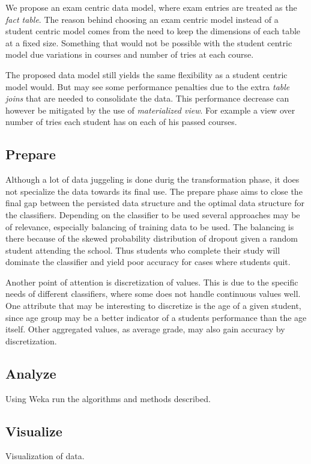 \bigskip\noindent
We propose an exam centric data model, where exam entries are treated as the \textit{fact table}. 
The reason behind choosing an exam centric model instead of a student centric model comes from the
need to keep the dimensions of each table at a fixed size. Something that would not be possible 
with the student centric model due variations in courses and number of tries at each course.

The proposed data model still yields the same flexibility as a student centric model would. 
But may see some performance penalties due to the extra \textit{table joins} that are needed to consolidate the data.
This performance decrease can however be mitigated by the use of \textit{materialized view}.
For example a view over number of tries each student has on each of his passed courses.

\subsection{Prepare}
Although a lot of data juggeling is done durig the transformation phase, it does not specialize the data towards its final use. 
The prepare phase aims to close the final gap between the persisted data structure and the optimal data structure for the classifiers.
Depending on the classifier to be used several approaches may be of relevance, especially balancing of training data to be used.
The balancing is there because of the skewed probability distribution of dropout given a random student attending the school.
Thus students who complete their study will dominate the classifier and yield poor accuracy for cases where students quit.

\bigskip\noindent
Another point of attention is discretization of values. 
This is due to the specific needs of different classifiers, where some does not handle continuous values well. 
One attribute that may be interesting to discretize is the age of a given student, 
since age group may be a better indicator of a students performance than the age itself. 
Other aggregated values, as average grade, may also gain accuracy by discretization.

\subsection{Analyze}
Using Weka run the algorithms and methods described.
\subsection{Visualize}	
Visualization of data.